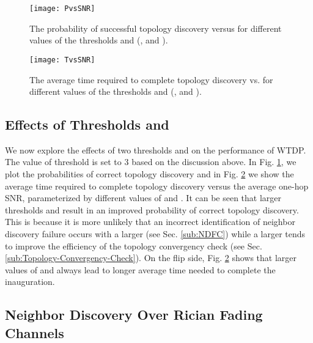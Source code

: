 \documentclass[10pt,english,two column]{IEEEtran}
\begin{document}
\begin{figure}[h]
\begin{centering}
\textsf{\texttt{[image: PvsSNR]}}
\par\end{centering}

\caption{\label{fig: PvsSNR}The probability of successful topology discovery
versus  for different values of the thresholds
 and  (,  and ).}
\end{figure}
\begin{figure}[h]
\begin{centering}
\textsf{\texttt{[image: TvsSNR]}}
\par\end{centering}

\caption{\label{fig:TvsSNR}The average time required to complete topology
discovery vs.  for different values of the thresholds
 and  (,  and ).}
\end{figure}



\subsection{Effects of Thresholds  and  }

We now explore the effects of two thresholds  and 
on the performance of WTDP. The value of threshold  is set
to 3 based on the discussion above. In Fig. \ref{fig: PvsSNR}, we
plot the probabilities of correct topology discovery and in Fig. \ref{fig:TvsSNR}
we show the average time required to complete topology discovery versus
the average one-hop SNR, parameterized by different values of 
and . It can be seen that larger thresholds  and
 result in an improved probability of correct topology discovery.
This is because it is more unlikely that an incorrect identification
of neighbor discovery failure occurs with a larger  (see
Sec. \ref{sub:NDFC}) while a larger  tends to improve the
efficiency of the topology convergency check (see Sec. \ref{sub:Topology-Convergency-Check}).
On the flip side, Fig. \ref{fig:TvsSNR} shows that larger values
of  and  always lead to longer average time needed
to complete the inauguration. 


\subsection{Neighbor Discovery Over Rician Fading Channels\label{sub:Neighbor-Discovery-Over}}
\end{document}
